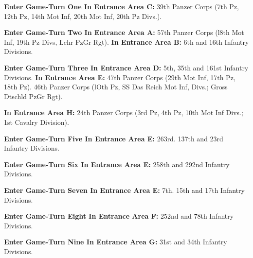\textbf{Enter Game-Turn One In Entrance Area C:}
39th Panzer Corps (7th Pz, 12th Pz, 14th Mot Inf,
20th Mot Inf, 20th Pz Divs.).

\textbf{Enter Game-Turn Two In Entrance Area A:}
57th Panzer Corps (l8th Mot Inf, 19th Pz Divs, Lehr PzGr Rgt).
\textbf{In Entrance Area B:}
6th and 16th Infantry Divisions.

\textbf{Enter Game-Turn Three In Entrance Area D:}
5th, 35th and 161st Infantry Divisions.
\textbf{In Entrance Area E:}
47th Panzer Corps (29th Mot Inf, 17th Pz, 18th Pz).
46th Panzer Corps (lOth Pz, SS Das Reich Mot Inf, Divs.; Gross Dtschld PzGr Rgt).

\textbf{In Entrance Area H:}
24th Panzer Corps (3rd Pz, 4th Pz, 10th Mot Inf Divs.; 1st Cavalry Division).

\textbf{Enter Game-Turn Five In Entrance Area E:}
263rd. 137th and 23rd Infantry Divisions.

\textbf{Enter Game-Turn Six In Entrance Area E:}
258th and 292nd Infantry Divisions.

\textbf{Enter Game-Turn Seven In Entrance Area E:}
7th. 15th and 17th Infantry Divisions.

\textbf{Enter Game-Turn Eight In Entrance Area F:}
252nd and 78th Infantry Divisions.

\textbf{Enter Game-Turn Nine In Entrance Area G:}
31st and 34th Infantry Divisions.